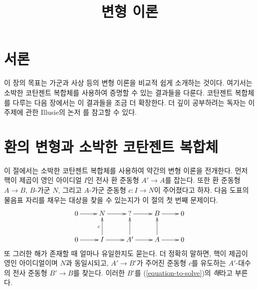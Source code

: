 

%


\title{변형 이론}


\maketitle

\label{section-phantom}

\tableofcontents

\section{서론}
\label{section-introduction}

\noindent
이 장의 목표는 가군과 사상 등의 변형 이론을 비교적 쉽게 소개하는 것이다.
여기서는 소박한 코탄젠트 복합체를 사용하여 증명할 수 있는 결과들을 다룬다.
코탄젠트 복합체를 다루는 다음 장에서는 이 결과들을 조금 더 확장한다.
더 깊이 공부하려는 독자는 이 주제에 관한 Illusie의 논저
\cite{cotangent}를 참고할 수 있다.





\section{환의 변형과 소박한 코탄젠트 복합체}
\label{section-deformations}

\noindent
이 절에서는 소박한 코탄젠트 복합체를 사용하여 약간의 변형 이론을 전개한다.
먼저 핵이 제곱이 영인 아이디얼 $I$인 전사 환 준동형 $A' \to A$를 잡는다.
또한 환 준동형 $A \to B$, $B$-가군 $N$, 그리고 $A$-가군 준동형
$c : I \to N$이 주어졌다고 하자. 다음 도표의 물음표 자리를 채우는 대상을
찾을 수 있는지가 이 절의 첫 번째 문제이다.
\begin{equation}
\label{equation-to-solve}
\vcenter{
\xymatrix{
0 \ar[r] & N \ar[r] & {?} \ar[r] & B \ar[r] & 0 \\
0 \ar[r] & I \ar[u]^c \ar[r] & A' \ar[u] \ar[r] & A \ar[u] \ar[r] & 0
}
}
\end{equation}
또 그러한 해가 존재할 때 얼마나 유일한지도 묻는다. 더 정확히 말하면,
핵이 제곱이 영인 아이디얼이며 $N$과 동일시되고, $A' \to B'$가 주어진
준동형 $c$를 유도하는 $A'$-대수의 전사 준동형 $B' \to B$를 찾는다.
이러한 $B'$를 (\ref{equation-to-solve})의 {\it 해}라고 부른다.

